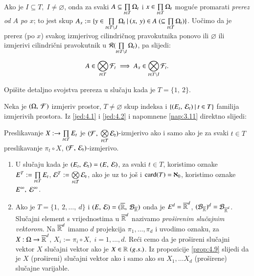 Ako je $I \subseteq T, \; I \neq \varnothing$, onda za svaki $A \subseteq \prod\limits_{t \in T}^{} \Omega_t$ i $x \in \prod\limits_{t \in T}^{} \Omega_t$ mogu\' ce promarati \emph{prerez od $A$ po $x$}; to jest skup $A_x := \{{y \in \prod\limits_{t \in T \setminus J}^{} \Omega_t} \: | \: {(x, \: y) \in A \; (\subseteq \prod\limits_{t \in T}^{} \Omega_t)}\}$.
Uo\v cimo da je prerez (po $x$) svakog izmjerivog cilindri\v cnog pravokutnika ponovo ili $\varnothing$ ili izmjerivi cilindri\v cni pravokutnik u $\mathcal{R}({\prod\limits_{t \in T \setminus I}^{} \Omega_t})$, pa slijedi:
\begin{equation}    \label{jed:4.7}
    A \in \bigotimes\limits_{t \in T}^{} \mathcal{F}_t \implies A_x \in \bigotimes\limits_{t \in T \setminus I}^{} \mathcal{F}_t.
\end{equation}

\begin{zad} \label{zad:4.8}
    Opi\v site detaljno svojstva prereza u slu\v caju kada je $T = \{1, \: 2\}$.
\end{zad}

Neka je $(\Omega, \: \mathcal{F})$ izmjeriv prostor, $T \neq \varnothing$ skup indeksa i $\{{(E_t, \: \mathcal{E}_t)} \: | \: {t \in T}\}$ familija izmjerivih prostora.
Iz \eqref{jed:4.1} i \eqref{jed:4.2} i napomnene \ref{nap:3.11} direktno slijedi:

\begin{prop} \label{prop:4.9}
    Preslikavanje $X : \to \prod\limits_{t \in T}^{} E_t$ je $(\mathcal{F}, \: \bigotimes\limits_{t \in T}^{} \mathcal{E}_t)$-izmjerivo ako i samo ako je za svaki $t \in T$ preslikavanje $\pi_t \circ X$, $(\mathcal{F}, \: \mathcal{E}_t)$-izmjerivo.
\end{prop}

\begin{nap} \label{nap:4.10}
    \begin{enumerate}[label=(\alph*)]
        \item U slu\v caju kada je $(E_t, \: \mathcal{E}_t) = (E, \: \mathcal{E})$, za svaki $t \in T$, koristimo oznake $E^T := \prod\limits_{t \in T}^{} E_t$, $\mathcal{E}^T := \bigotimes\limits_{t \in T}^{} \mathcal{E}_t$, ako je uz to jo\v s i $\textnormal{card}({T}) = \aleph_0$, koristimo oznake $E^\infty, \; \mathcal{E}^\infty$.
        \item Ako je $T = \{1, \: 2, \dots, \: d\}$ i $(E, \: \mathcal{E}) = ({\overline{\mathbb{R}}}, \: {\mathcal{B}_{\overline{\mathbb{R}}}})$ onda je $E^d = \overline{\mathbb{R}}^d$, $(\mathcal{B}_{\overline{\mathbb{R}}})^d = \mathcal{B}_{\overline{\mathbb{R}}^d}$.
        Slu\v cajni element s vrijednostima u $\overline{\mathbb{R}}^d$ nazivamo \emph{pro\v sirenim slu\v cajnim vektorom}.
        Na $\overline{\mathbb{R}}^d$ imamo $d$ projekcija $\pi_1, \dots, \pi_d$ i uvodimo oznaku, za $X : \Omega \to \overline{\mathbb{R}}^d$, $X_i := \pi_i \circ X, \; i = 1, \dots, d$.
        Re\' ci cemo da je pro\v sireni slu\v cajni vektor $X$ slu\v cajni vektor ako je $X \in \mathbb{R} \; (g.s.)$.
        Iz propozicije \ref{prop:4.9} slijedi da je $X$ (pro\v sireni) slu\v cajni vektor ako i samo ako su $X_1, \dots X_d$ (pro\v sirene) slu\v cajne varijable.
    \end{enumerate}
\end{nap}

